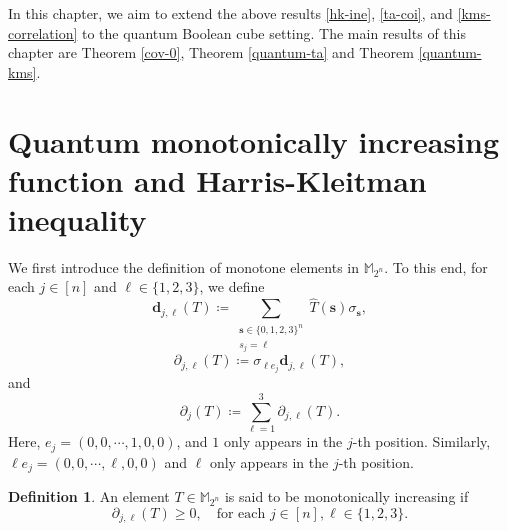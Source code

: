\documentclass{amsbook}
\theoremstyle{definition}
\newtheorem{definition}[theorem]{Definition}
\theoremstyle{remark}
\numberwithin{section}{chapter}
\numberwithin{equation}{chapter}
\newcommand{\1}{\mathbf{1}}
\newcommand{\s}{\mathbf{s}}
\newcommand{\dc}{\mathbf{d}}
\begin{document}
 
In this chapter, we aim to extend the above results \eqref{hk-ine}, \eqref{ta-coi},  and \eqref{kms-correlation} to the quantum Boolean cube setting. The main results of this chapter are Theorem  \ref{cov-0}, Theorem \ref{quantum-ta} and Theorem \ref{quantum-kms}.
\section[Quantum Monotone Functions]{Quantum monotonically increasing function and Harris-Kleitman inequality}

We first introduce the definition of monotone elements in $\mathbb{M}_{2^n}$. To this end, for each $j\in [n]$ and  $\ell\in\{1,2,3\}$,  we define
\[
\dc_{j,\ell}(T)\coloneqq\sum_{\substack{\s\in\{0,1,2,3\}^{n}\\ s_{j}=\ell}}\widehat{T}(\s)\sigma_{\s},
\]
\[
\partial_{j,\ell}(T)\coloneqq\sigma_{\ell e_{j}}\dc_{j,\ell}(T),
\]
and
\[
\partial_{j}(T)\coloneqq \sum_{\ell=1}^3\partial_{j,\ell}(T).
\]
Here, 
	$e_j=(0,0,\cdots, 1,0,0)$, and $1$ only appears in the $j$-th position. Similarly,  $\ell e_j=(0,0,\cdots, \ell,0,0)$ and $\ell$ only appears in the $j$-th position.

\begin{definition} \label{mo-in-o}  
	An element $T\in \mathbb{M}_{2^n}$ is said to be monotonically increasing if
	$$\partial_{j,\ell}(T)\geq0,\quad\mbox{for each $j\in[n], \ell\in\{1,2,3\}$}.$$
\end{definition}
\end{document}
